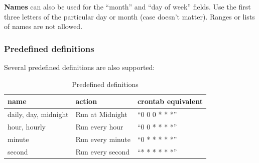 \textbf{Names} can also be used for the ``month'' and ``day of week'' fields.
Use the first three letters of the particular day or month (case doesn't matter).
Ranges or lists of names are not allowed.

\subsubsection{Predefined definitions}
Several predefined definitions are also supported:

\begin{table}[ht]
 \caption[Predefined Crontab definitions]{Predefined definitions}
 \begin{tabular}{l l l}
  \toprule
  name & action & crontab equivalent \\
  \midrule
  daily, day, midnight & Run at Midnight & ``0 0 0 * * *'' \\
  hour, hourly & Run every hour & ``0 0 * * * *'' \\
  minute & Run every minute & ``0 * * * * *'' \\
  second & Run every second & ``* * * * * *'' \\
  \bottomrule
 \end{tabular}
\end{table}
